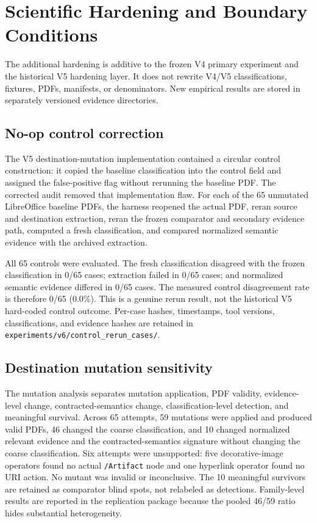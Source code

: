 \section{Scientific Hardening and Boundary Conditions}
\label{sec:hardening}

The additional hardening is additive to the frozen V4 primary experiment and the historical V5 hardening layer. It does not rewrite V4/V5 classifications, fixtures, PDFs, manifests, or denominators. New empirical results are stored in separately versioned evidence directories.

\subsection{No-op control correction}
The V5 destination-mutation implementation contained a circular control construction: it copied the baseline classification into the control field and assigned the false-positive flag without rerunning the baseline PDF. The corrected audit removed that implementation flaw. For each of the 65 unmutated LibreOffice baseline PDFs, the harness reopened the actual PDF, reran source and destination extraction, reran the frozen comparator and secondary evidence path, computed a fresh classification, and compared normalized semantic evidence with the archived extraction.

All 65 controls were evaluated. The fresh classification disagreed with the frozen classification in 0/65 cases; extraction failed in 0/65 cases; and normalized semantic evidence differed in 0/65 cases. The measured control disagreement rate is therefore 0/65 (0.0\%). This is a genuine rerun result, not the historical V5 hard-coded control outcome. Per-case hashes, timestamps, tool versions, classifications, and evidence hashes are retained in \texttt{experiments/v6/control\_rerun\_cases/}.

\subsection{Destination mutation sensitivity}
The mutation analysis separates mutation application, PDF validity, evidence-level change, contracted-semantics change, classification-level detection, and meaningful survival. Across 65 attempts, 59 mutations were applied and produced valid PDFs, 46 changed the coarse classification, and 10 changed normalized relevant evidence and the contracted-semantics signature without changing the coarse classification. Six attempts were unsupported: five decorative-image operators found no actual \texttt{/Artifact} node and one hyperlink operator found no URI action. No mutant was invalid or inconclusive. The 10 meaningful survivors are retained as comparator blind spots, not relabeled as detections. Family-level results are reported in the replication package because the pooled 46/59 ratio hides substantial heterogeneity.

